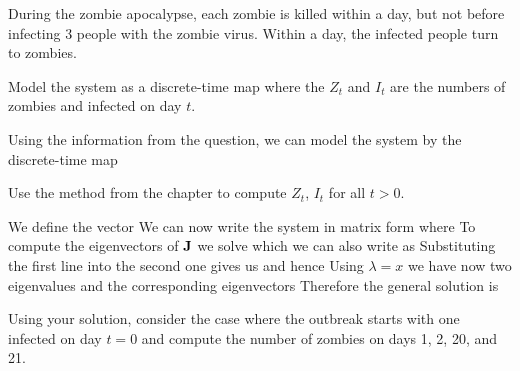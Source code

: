 During the zombie apocalypse, each zombie is killed within a day, but not before infecting 3 people with the zombie virus. Within a day, the infected people turn to zombies. 

\subquestion Model the system as a discrete-time map where the $Z_t$ and $I_t$ are the numbers of zombies and infected on day $t$.

\solution 
Using the information from the question, we can model the system by the discrete-time map

\subquestion Use the method from the chapter to compute $Z_t$,  $I_t$ for all $t>0$.

\solution
We define the vector 
We can now write the system in matrix form
where 
To compute the eigenvectors of $\bf J$ we solve 
which we can also write as
Substituting the first line into the second one gives us 
and hence
Using $\lambda=x$ we have now two eigenvalues
and the corresponding eigenvectors 
Therefore the general solution is 

\subquestion Using your solution, consider the case where the outbreak starts with one infected on day $t=0$ and compute the number of zombies on days 1, 2, 20, and 21.

